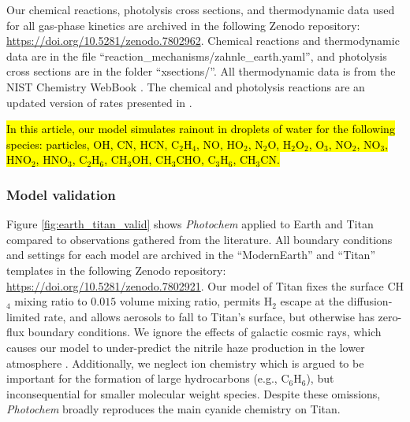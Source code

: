 Our chemical reactions, photolysis cross sections, and thermodynamic data used for all gas-phase kinetics are archived in the following Zenodo repository: \url{https://doi.org/10.5281/zenodo.7802962}. Chemical reactions and thermodynamic data are in the file ``reaction\_mechanisms/zahnle\_earth.yaml'', and photolysis cross sections are in the folder ``xsections/''. All thermodynamic data is from the NIST Chemistry WebBook \hl{\mbox{\citep{Linstrom_1998}}}. The chemical and photolysis reactions are an updated version of rates presented in \citet{Zahnle_2016}.

\hl{In this article, our model simulates rainout in droplets of water for the following species: particles, OH, CN, HCN, C$_2$H$_4$, NO, HO$_2$, N$_2$O, H$_2$O$_2$, O$_3$, NO$_2$, NO$_3$, HNO$_2$, HNO$_3$, C$_2$H$_6$, CH$_3$OH, CH$_3$CHO, C$_3$H$_6$, CH$_3$CN.}

\subsubsection{Model validation} \label{sec:clima_model_validation}

Figure \ref{fig:earth_titan_valid} shows \emph{Photochem} applied to Earth and Titan compared to observations gathered from the literature. All boundary conditions and settings for each model are archived in the ``ModernEarth'' and ``Titan'' templates in the following Zenodo repository: \url{https://doi.org/10.5281/zenodo.7802921}. Our model of Titan fixes the surface CH$_4$ mixing ratio to $0.015$ volume mixing ratio, permits H$_2$ escape at the diffusion-limited rate, and allows aerosols to fall to Titan's surface, but otherwise has zero-flux boundary conditions. We ignore the effects of galactic cosmic rays, which causes our model to under-predict the nitrile haze production in the lower atmosphere \citep{Lavvas_2008b}. Additionally, we neglect ion chemistry which is argued to be important for the formation of large hydrocarbons (e.g., $\mathrm{C_6H_6}$), but inconsequential for smaller molecular weight species. Despite these omissions, \emph{Photochem} broadly reproduces the main cyanide chemistry on Titan.

